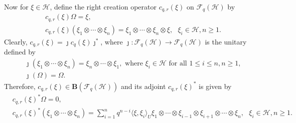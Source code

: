\documentclass[12pt, a4paper,reqno]{amsart}
\theoremstyle{definition}
\renewcommand{\leq}{\leqslant}
\renewcommand{\geq}{\geqslant}
\def\C{\mathbb C}
\def\R{\mathbb R}
\newcommand{\CF}{\mathcal{F}}
\newcommand{\CH}{\mathcal{H}}
\newcommand{\CJ}{\mathcal{J}}
\newcommand{\half}{{\frac{1}{2}}}
\begin{document}


Now for $\xi\in \CH$, define the right creation operator $c_{q, r}(\xi)$ on $\CF_q(\CH) $ by  
\begin{align}\label{Rightmult}
& c_{q, r}(\xi) \Omega = \xi, \\
\nonumber&c_{q, r}(\xi) (\xi_1 \otimes \cdots \otimes \xi_n) =  \xi_1 \otimes \cdots \otimes  \xi_n \otimes \xi, \text{ }\xi_{i}\in \CH, n\geq 1. 
\end{align}
Clearly, $c_{q, r}(\xi) = \jmath c_q(\xi) {\jmath}^{*}$, where $\jmath: \mathcal{F}_{q}(\CH) \rightarrow \mathcal{F}_{q}(\CH) $ is the unitary defined by 
\begin{align}\label{flip}
&\jmath ( \xi_1 \otimes \cdots \otimes \xi_n ) =  \xi_n \otimes \cdots \otimes \xi_1, \text{ where }\xi_{i}\in \CH \text{ for all }1\leq i\leq n, n\geq 1,\\
\nonumber&\jmath(\Omega)=\Omega.
\end{align}
Therefore, $c_{q, r}(\xi)\in \mathbf{B}(\CF_q(\CH)) $ and its adjoint $c_{q, r}(\xi)^*$ is given by 
\begin{align}\label{Rightmultadj}
&c_{q, r}(\xi)^* \Omega = 0, \\
\nonumber&c_{q, r}(\xi)^* ( \xi_1 \otimes \cdots \otimes \xi_n) = \sum_{i = 1}^n q^{n-i}\langle  \xi , \xi_i \rangle_U \xi_1 \otimes \cdots \otimes \xi_{i-1} \otimes \xi_{i+1} \otimes \cdots \otimes \xi_n, \text{ }\xi_{i}\in \CH, n\geq 1. 
\end{align} 
\end{document}

